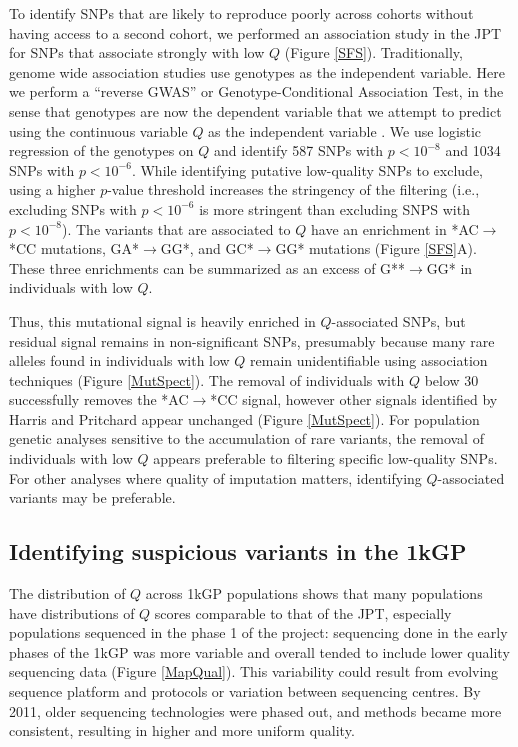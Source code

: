 \documentclass[9pt,lineno]{elife}
\begin{document}
To identify SNPs that are likely to reproduce poorly across cohorts without having access to a second cohort, we performed an association study in the JPT for SNPs that associate strongly with low $Q$ (Figure \ref{SFS}).
Traditionally, genome wide association studies use genotypes as the independent variable. 
Here we perform a ``reverse GWAS'' or Genotype-Conditional Association Test, in the sense that genotypes are now the dependent variable that we attempt to predict using the continuous variable $Q$ as the independent variable \citep{song2015testing}.
We use logistic regression of the genotypes on $Q$ and identify 587 SNPs with $p < 10^{-8}$ and 1034 SNPs with $ p < 10^{-6}$. 
While identifying putative low-quality SNPs to exclude, using a higher $p$-value threshold increases the stringency of the filtering (i.e., excluding SNPs with $ p < 10^{-6}$ is more stringent than excluding SNPS with $p < 10^{-8}$). 
The variants that are associated to $Q$ have an enrichment in *AC${\rightarrow}$*CC mutations, GA*${\rightarrow}$GG*, and GC*${\rightarrow}$GG* mutations (Figure \ref{SFS}A).
These three enrichments can be summarized as an excess of G**${\rightarrow}$GG* in individuals with low $Q$.

Thus, this mutational signal is heavily enriched in $Q$-associated SNPs, but residual signal remains in non-significant SNPs, presumably because many rare alleles found in individuals with low $Q$ remain unidentifiable using association techniques (Figure \ref{MutSpect}). The removal of individuals with $Q$ below 30 successfully removes the *AC${\rightarrow}$*CC signal, however other signals identified by Harris and Pritchard appear unchanged (Figure \ref{MutSpect}).
For population genetic analyses sensitive to the accumulation of rare variants, the removal of individuals with low $Q$ appears preferable to filtering specific low-quality SNPs. 
For other analyses where quality of imputation matters, identifying $Q$-associated variants may be preferable. 


\subsection{Identifying suspicious variants in the 1kGP}
The distribution of $Q$ across 1kGP populations shows that many populations have distributions of $Q$ scores comparable to that of the JPT, especially populations sequenced in the phase 1 of the project: sequencing done in the early phases of the 1kGP was more variable and overall tended to include lower quality sequencing data (Figure \ref{MapQual}).
This variability could result from evolving sequence platform and protocols or variation between sequencing centres. 
By 2011, older sequencing technologies were phased out, and methods became more consistent, resulting in higher and more uniform quality.
\end{document}
